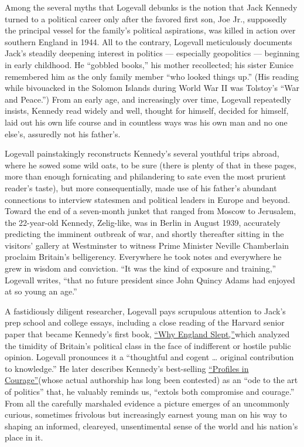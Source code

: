 Among the several myths that Logevall debunks is the notion that Jack
Kennedy turned to a political career only after the favored first son,
Joe Jr., supposedly the principal vessel for the family's political
aspirations, was killed in action over southern England in 1944. All to
the contrary, Logevall meticulously documents Jack's steadily deepening
interest in politics --- especially geopolitics --- beginning in early
childhood. He ``gobbled books,'' his mother recollected; his sister
Eunice remembered him as the only family member ``who looked things
up.'' (His reading while bivouacked in the Solomon Islands during World
War II was Tolstoy's ``War and Peace.'') From an early age, and
increasingly over time, Logevall repeatedly insists, Kennedy read widely
and well, thought for himself, decided for himself, laid out his own
life course and in countless ways was his own man and no one else's,
assuredly not his father's.

Logevall painstakingly reconstructs Kennedy's several youthful trips
abroad, where he sowed some wild oats, to be sure (there is plenty of
that in these pages, more than enough fornicating and philandering to
sate even the most prurient reader's taste), but more consequentially,
made use of his father's abundant connections to interview statesmen and
political leaders in Europe and beyond. Toward the end of a seven-month
junket that ranged from Moscow to Jerusalem, the 22-year-old Kennedy,
Zelig-like, was in Berlin in August 1939, accurately predicting the
imminent outbreak of war, and shortly thereafter sitting in the
visitors' gallery at Westminster to witness Prime Minister Neville
Chamberlain proclaim Britain's belligerency. Everywhere he took notes
and everywhere he grew in wisdom and conviction. ``It was the kind of
exposure and training,'' Logevall writes, ``that no future president
since John Quincy Adams had enjoyed at so young an age.''

A fastidiously diligent researcher, Logevall pays scrupulous attention
to Jack's prep school and college essays, including a close reading of
the Harvard senior paper that became Kennedy's first book,
\href{https://www.historycentral.com/JFK/bio/Why.html}{``Why England
Slept,''}which analyzed the timidity of Britain's political class in the
face of indifferent or hostile public opinion. Logevall pronounces it a
``thoughtful and cogent \ldots{} original contribution to knowledge.''
He later describes Kennedy's best-selling
\href{https://www.jfklibrary.org/events-and-awards/profile-in-courage-award/about-the-book}{``Profiles
in Courage''}(whose actual authorship has long been contested) as an
``ode to the art of politics'' that, he valuably reminds us, ``extols
both compromise and courage.'' From all the carefully marshaled evidence
a picture emerges of an uncommonly curious, sometimes frivolous but
increasingly earnest young man on his way to shaping an informed,
cleareyed, unsentimental sense of the world and his nation's place in
it.

